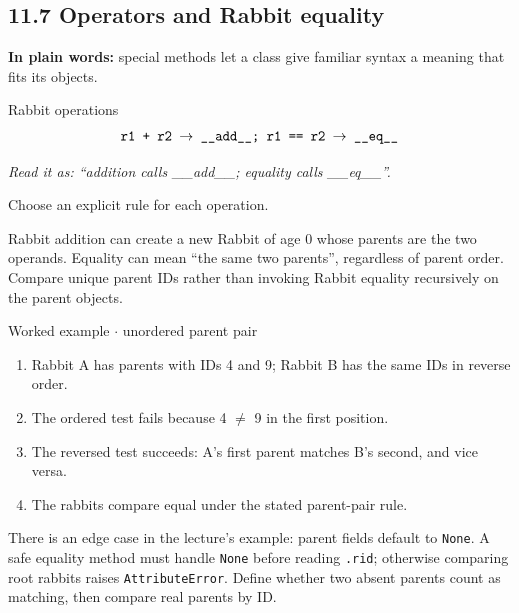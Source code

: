 \documentclass[11pt]{article}
\begin{document}
\begin{keepsection}
\section{11.7 Operators and Rabbit equality}

\begin{plainbox}\textbf{In plain words:} special methods let a class give familiar syntax a meaning that fits its objects.\end{plainbox}

\begin{equationcard}{Rabbit operations}
\[ \begin{gathered} \texttt{r1 + r2 \ensuremath{\to} \_\_add\_\_; r1 == r2 \ensuremath{\to} \_\_eq\_\_} \end{gathered} \]
{\small \emph{Read it as: “addition calls \_\_add\_\_; equality calls \_\_eq\_\_”.}\par Choose an explicit rule for each operation.}
\end{equationcard}

Rabbit addition can create a new Rabbit of age 0 whose parents are the two operands. Equality can mean “the same two parents”, regardless of parent order. Compare unique parent IDs rather than invoking Rabbit equality recursively on the parent objects.

\begin{workedbox}{Worked example \ensuremath{\cdot} unordered parent pair}
\begin{enumerate}
\item Rabbit A has parents with IDs 4 and 9; Rabbit B has the same IDs in reverse order.
\item The ordered test fails because 4 \ensuremath{\neq} 9 in the first position.
\item The reversed test succeeds: A’s first parent matches B’s second, and vice versa.
\item The rabbits compare equal under the stated parent-pair rule.
\end{enumerate}
\end{workedbox}

There is an edge case in the lecture’s example: parent fields default to \texttt{None}. A safe equality method must handle \texttt{None} before reading \texttt{.rid}; otherwise comparing root rabbits raises \texttt{AttributeError}. Define whether two absent parents count as matching, then compare real parents by ID.


\end{keepsection}
\end{document}
